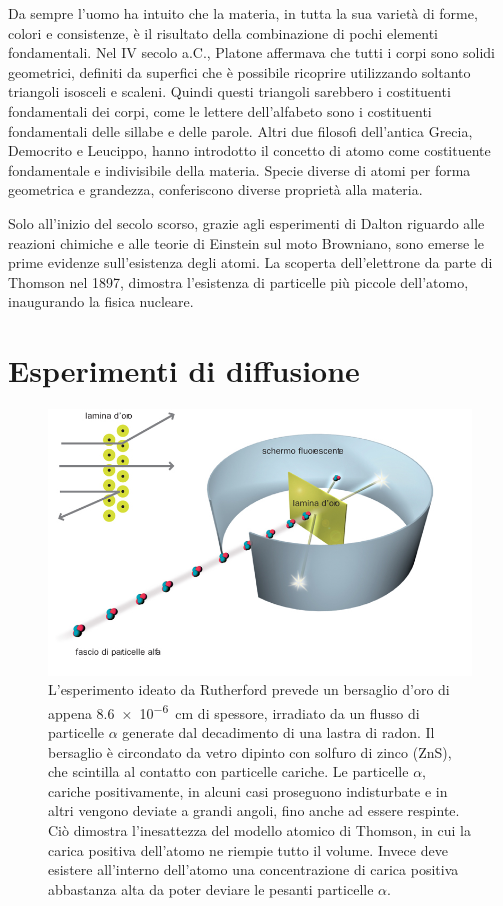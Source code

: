 \documentclass[../main.tex]{subfiles}
\begin{document}
Da sempre l'uomo ha intuito che la materia, in tutta la sua varietà di forme, colori e consistenze, è il risultato della combinazione di pochi elementi fondamentali. Nel IV secolo a.C., Platone affermava che tutti i corpi sono solidi geometrici, definiti da superfici che è possibile ricoprire utilizzando soltanto triangoli isosceli e scaleni. Quindi questi triangoli sarebbero i costituenti fondamentali dei corpi, come le lettere dell'alfabeto sono i costituenti fondamentali delle sillabe e delle parole. Altri due filosofi dell'antica Grecia, Democrito e Leucippo, hanno introdotto il concetto di atomo come costituente fondamentale e indivisibile della materia. Specie diverse di atomi per forma geometrica e grandezza, conferiscono diverse proprietà alla materia.

Solo all'inizio del secolo scorso, grazie agli esperimenti di Dalton riguardo alle reazioni chimiche e alle teorie di Einstein sul moto Browniano, sono emerse le prime evidenze sull'esistenza degli atomi. La scoperta dell'elettrone da parte di Thomson nel 1897, dimostra l'esistenza di particelle più piccole dell'atomo, inaugurando la fisica nucleare.

\section{Esperimenti di diffusione}

\begin{figure}[tb]
    \centering
    \includegraphics[width=\textwidth]{rutherford.jpg}
    \caption{L'esperimento ideato da Rutherford prevede un bersaglio d'oro di appena \SI{8.6e-6}{\cm} di spessore, irradiato da un flusso di particelle $\alpha$ generate dal decadimento di una lastra di radon. Il bersaglio è circondato da vetro dipinto con solfuro di zinco (ZnS), che scintilla al contatto con particelle cariche. Le particelle $\alpha$, cariche positivamente, in alcuni casi proseguono indisturbate e in altri vengono deviate a grandi angoli, fino anche ad essere respinte. Ciò dimostra l'inesattezza del modello atomico di Thomson, in cui la carica positiva dell'atomo ne riempie tutto il volume. Invece deve esistere all'interno dell'atomo una concentrazione di carica positiva abbastanza alta da poter deviare le pesanti particelle $\alpha$. \cite{as9_acdm}}
    \label{fig:rutherford}
\end{figure}
\end{document}
